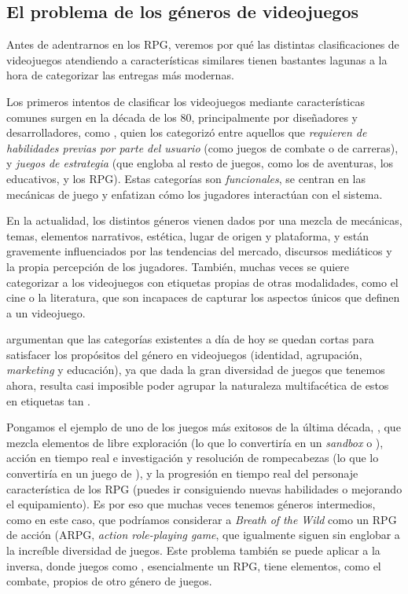 \subsection{El problema de los géneros de videojuegos}
Antes de adentrarnos en los RPG, veremos por qué las distintas clasificaciones de videojuegos atendiendo a características similares tienen bastantes lagunas a la hora de categorizar las entregas más modernas.

\medskip

Los primeros intentos de clasificar los videojuegos mediante características comunes surgen en la década de los 80, principalmente por diseñadores y desarrolladores, como \cite{Crawford84}, quien los categorizó entre aquellos que \textit{requieren de habilidades previas por parte del usuario} (como juegos de combate o de carreras), y \textit{juegos de estrategia} (que engloba al resto de juegos, como los de aventuras, los educativos, y los RPG). Estas categorías son \textit{funcionales}, se centran en las mecánicas de juego y enfatizan cómo los jugadores interactúan con el sistema.

\smallskip

En la actualidad, los distintos géneros vienen dados por una mezcla de mecánicas, temas, elementos narrativos, estética, lugar de origen y plataforma, y están gravemente influenciados por las tendencias del mercado, discursos mediáticos y la propia percepción de los jugadores. También, muchas veces se quiere categorizar a los videojuegos con etiquetas propias de otras modalidades, como el cine o la literatura, que son incapaces de capturar los aspectos únicos que definen a un videojuego.

\smallskip

\cite{FailGeneros} argumentan que las categorías existentes a día de hoy se quedan cortas para satisfacer los propósitos del género en videojuegos (identidad, agrupación, \textit{marketing} y educación), ya que dada la gran diversidad de juegos que tenemos ahora, resulta casi imposible poder agrupar la naturaleza multifacética de estos en etiquetas tan .

\smallskip

Pongamos el ejemplo de uno de los juegos más exitosos de la última década, , que mezcla elementos de libre exploración (lo que lo convertiría en un \textit{sandbox} o ), acción en tiempo real e investigación y resolución de rompecabezas (lo que lo convertiría en un juego de ), y la progresión en tiempo real del personaje característica de los RPG (puedes ir consiguiendo nuevas habilidades o mejorando el equipamiento). Es por eso que muchas veces tenemos géneros intermedios, como en este caso, que podríamos considerar a \textit{Breath of the Wild} como un RPG de acción (ARPG, \textit{action role-playing game}, que igualmente siguen sin englobar a la increíble diversidad de juegos. Este problema también se puede aplicar a la inversa, donde juegos como , esencialmente un RPG, tiene elementos, como el combate, propios de otro género de juegos.

